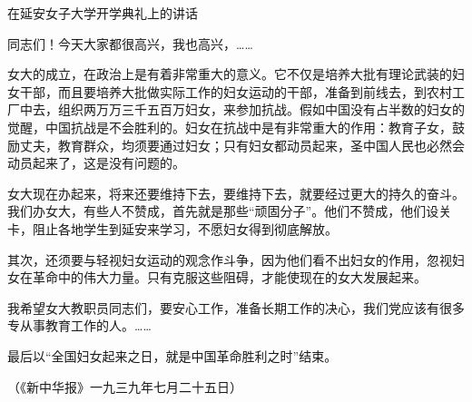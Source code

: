 在延安女子大学开学典礼上的讲话



同志们！今天大家都很高兴，我也高兴，……

女大的成立，在政治上是有着非常重大的意义。它不仅是培养大批有理论武装的妇女干部，而且要培养大批做实际工作的妇女运动的干部，准备到前线去，到农村工厂中去，组织两万万三千五百万妇女，来参加抗战。假如中国没有占半数的妇女的觉醒，中国抗战是不会胜利的。妇女在抗战中是有非常重大的作用：教育子女，鼓励丈夫，教育群众，均须要通过妇女；只有妇女都动员起来，圣中国人民也必然会动员起来了，这是没有问题的。

女大现在办起来，将来还要维持下去，要维持下去，就要经过更大的持久的奋斗。我们办女大，有些人不赞成，首先就是那些“顽固分子”。他们不赞成，他们设关卡，阻止各地学生到延安来学习，不愿妇女得到彻底解放。

其次，还须要与轻视妇女运动的观念作斗争，因为他们看不出妇女的作用，忽视妇女在革命中的伟大力量。只有克服这些阻碍，才能使现在的女大发展起来。

我希望女大教职员同志们，要安心工作，准备长期工作的决心，我们党应该有很多专从事教育工作的人。……

最后以“全国妇女起来之日，就是中国革命胜利之时”结束。

（《新中华报》一九三九年七月二十五日）